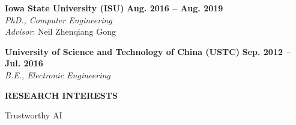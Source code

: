 \documentclass[11pt]{article}
\begin{document}
\begin{spacing}{1}
\begin{list}{}{\leftmargin=4em}
\item \textbf{Iowa State University (ISU)} \hfill{\textbf{Aug. 2016 -- Aug. 2019}} 	\\
\emph{PhD., Computer Engineering}\\
\emph{Advisor}: Neil Zhenqiang Gong


\item \textbf{University of Science and Technology of China (USTC)} \hfill{\textbf{Sep. 2012 -- Jul. 2016}} 	\\
\emph{B.E., Electronic Engineering}

\end{list}

\vspace{3mm}
{\bf \Large RESEARCH INTERESTS}\\
\vspace{-4mm}
\begin{list}{}{\leftmargin=4em}

\item {Trustworthy AI}

\end{list}



\end{spacing}
\end{document}
